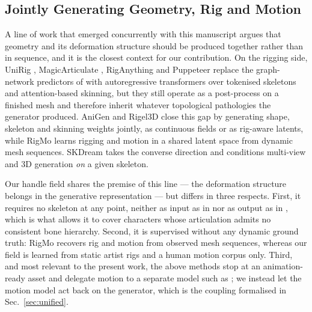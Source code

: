 \documentclass[lettersize,journal]{IEEEtran}
\begin{document}
\subsection{Jointly Generating Geometry, Rig and Motion}
A line of work that emerged concurrently with this manuscript argues that geometry and its
deformation structure should be produced together rather than in sequence, and it is the
closest context for our contribution. On the rigging side, UniRig \cite{zhang2025unirig},
MagicArticulate \cite{song2025magicarticulate}, RigAnything \cite{liu2025riganything} and
Puppeteer \cite{song2026puppeteer} replace the graph-network predictors of
\cite{xu2019predicting,xu2020rignet} with autoregressive transformers over tokenised
skeletons and attention-based skinning, but they still operate as a post-process on a
finished mesh and therefore inherit whatever topological pathologies the generator produced.
AniGen \cite{huang2026anigen} and Rigel3D \cite{rigel3d2026} close this gap by generating
shape, skeleton and skinning weights jointly, as continuous fields or as rig-aware latents,
while RigMo \cite{zhang2026rigmo} learns rigging and motion in a shared latent space from
dynamic mesh sequences. SKDream \cite{xu2025skdream} takes the converse direction and
conditions multi-view and 3D generation \textit{on} a given skeleton.

Our handle field shares the premise of this line --- the deformation structure belongs in the
generative representation --- but differs in three respects. First, it requires no skeleton at
any point, neither as input as in \cite{xu2025skdream} nor as output as in
\cite{huang2026anigen,rigel3d2026}, which is what allows it to cover characters whose
articulation admits no consistent bone hierarchy. Second, it is supervised without any
dynamic ground truth: RigMo \cite{zhang2026rigmo} recovers rig and motion from observed mesh
sequences, whereas our field is learned from static artist rigs and a human motion corpus
only. Third, and most relevant to the present work, the above methods stop at an
animation-ready asset and delegate motion to a separate model such as
\cite{gat2025anytop,mou2026unimate}; we instead let the motion model act back on the
generator, which is the coupling formalised in Sec.~\ref{sec:unified}.
\end{document}
